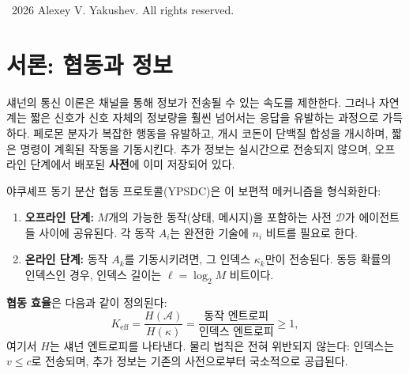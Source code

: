 \documentclass[12pt,a4paper]{article}
\begin{document}
		\vspace{1cm}
		\textcopyright\ 2026 Alexey V. Yakushev. All rights reserved.
	
	
	\tableofcontents
	\newpage
	
	\section{서론: 협동과 정보}
	\label{sec:intro}
	
	섀넌의 통신 이론은 채널을 통해 정보가 전송될 수 있는 속도를 제한한다. 그러나 자연계는 짧은 신호가 신호 자체의 정보량을 훨씬 넘어서는 응답을 유발하는 과정으로 가득하다. 페로몬 분자가 복잡한 행동을 유발하고, 개시 코돈이 단백질 합성을 개시하며, 짧은 명령이 계획된 작동을 기동시킨다. 추가 정보는 실시간으로 전송되지 않으며, 오프라인 단계에서 배포된 \textbf{사전}에 이미 저장되어 있다.
	
	야쿠셰프 동기 분산 협동 프로토콜(YPSDC)은 이 보편적 메커니즘을 형식화한다:
	\begin{enumerate}[label=(\roman*)]
		\item \textbf{오프라인 단계:} \(M\)개의 가능한 동작(상태, 메시지)을 포함하는 사전 \(\mathcal{D}\)가 에이전트들 사이에 공유된다. 각 동작 \(A_i\)는 완전한 기술에 \(n_i\) 비트를 필요로 한다.
		\item \textbf{온라인 단계:} 동작 \(A_k\)를 기동시키려면, 그 인덱스 \(\kappa_k\)만이 전송된다. 동등 확률의 인덱스인 경우, 인덱스 길이는 \(\ell = \log_2 M\) 비트이다.
	\end{enumerate}
	\textbf{협동 효율}은 다음과 같이 정의된다:
	\begin{equation}
		\boxed{K_{\mathrm{eff}} = \frac{H(\mathcal{A})}{H(\kappa)} = \frac{\text{동작 엔트로피}}{\text{인덱스 엔트로피}} \ge 1},
		\label{eq:keff-def}
	\end{equation}
	여기서 \(H\)는 섀넌 엔트로피를 나타낸다. 물리 법칙은 전혀 위반되지 않는다: 인덱스는 \(v \le c\)로 전송되며, 추가 정보는 기존의 사전으로부터 국소적으로 공급된다.
	
	\begin{center}
	\end{center}
	
\end{document}
